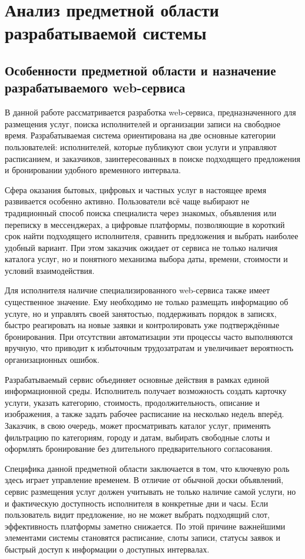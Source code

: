 \section{Анализ предметной области разрабатываемой системы}

\subsection{Особенности предметной области и назначение разрабатываемого web-сервиса}

В данной работе рассматривается разработка web-сервиса, предназначенного для размещения услуг, поиска исполнителей и организации записи на свободное время. Разрабатываемая система ориентирована на две основные категории пользователей: исполнителей, которые публикуют свои услуги и управляют расписанием, и заказчиков, заинтересованных в поиске подходящего предложения и бронировании удобного временного интервала.

Сфера оказания бытовых, цифровых и частных услуг в настоящее время развивается особенно активно. Пользователи всё чаще выбирают не традиционный способ поиска специалиста через знакомых, объявления или переписку в мессенджерах, а цифровые платформы, позволяющие в короткий срок найти подходящего исполнителя, сравнить предложения и выбрать наиболее удобный вариант. При этом заказчик ожидает от сервиса не только наличия каталога услуг, но и понятного механизма выбора даты, времени, стоимости и условий взаимодействия.

Для исполнителя наличие специализированного web-сервиса также имеет существенное значение. Ему необходимо не только размещать информацию об услуге, но и управлять своей занятостью, поддерживать порядок в записях, быстро реагировать на новые заявки и контролировать уже подтверждённые бронирования. При отсутствии автоматизации эти процессы часто выполняются вручную, что приводит к избыточным трудозатратам и увеличивает вероятность организационных ошибок.

Разрабатываемый сервис объединяет основные действия в рамках единой информационной среды. Исполнитель получает возможность создать карточку услуги, указать категорию, стоимость, продолжительность, описание и изображения, а также задать рабочее расписание на несколько недель вперёд. Заказчик, в свою очередь, может просматривать каталог услуг, применять фильтрацию по категориям, городу и датам, выбирать свободные слоты и оформлять бронирование без длительного предварительного согласования.

Специфика данной предметной области заключается в том, что ключевую роль здесь играет управление временем. В отличие от обычной доски объявлений, сервис размещения услуг должен учитывать не только наличие самой услуги, но и фактическую доступность исполнителя в конкретные дни и часы. Если пользователь видит предложение, но не может выбрать подходящий слот, эффективность платформы заметно снижается. По этой причине важнейшими элементами системы становятся расписание, слоты записи, статусы заявок и быстрый доступ к информации о доступных интервалах.

